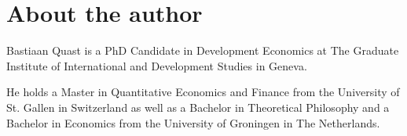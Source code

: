 
\chapter*{About the author}

Bastiaan Quast is a PhD Candidate in Development Economics at The
Graduate Institute of International and Development Studies in Geneva.

He holds a Master in Quantitative Economics and Finance from the University
of St. Gallen in Switzerland as well as a Bachelor in Theoretical
Philosophy and a Bachelor in Economics from the University of Groningen
in The Netherlands.
